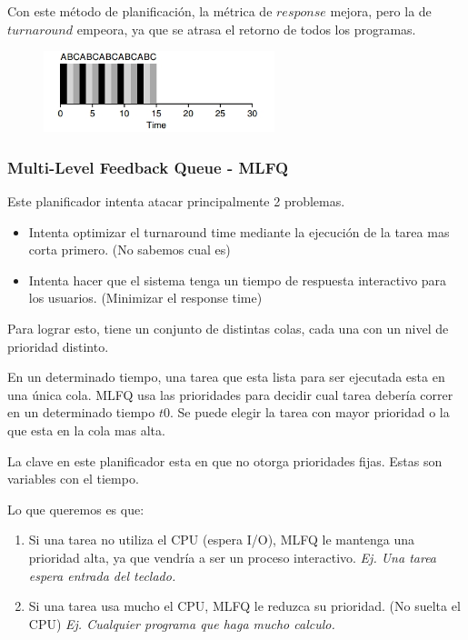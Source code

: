 \documentclass[titlepage,a4paper]{article}
\begin{document}
Con este método de planificación, la métrica de $response$ mejora, pero la de $turnaround$ empeora, ya que se atrasa el retorno de todos los programas.

\begin{figure}[!htb]
    \centering
    \includegraphics[width=0.6\textwidth]{ImagenesApunte/round_robin.jpg}
\end{figure}

\subsubsection*{Multi-Level Feedback Queue - MLFQ}
Este planificador intenta atacar principalmente 2 problemas.
\begin{itemize}
    \item Intenta optimizar el turnaround time mediante la ejecución de la tarea mas corta primero. (No sabemos cual es)
    \item Intenta hacer que el sistema tenga un tiempo de respuesta interactivo para los usuarios. (Minimizar el response time)
\end{itemize}

Para lograr esto, tiene un conjunto de distintas colas, cada una con un nivel de prioridad distinto.

En un determinado tiempo, una tarea que esta lista para ser ejecutada esta en una única cola. MLFQ usa las prioridades para decidir cual tarea debería correr en un determinado tiempo $t0$. Se puede elegir la tarea con mayor prioridad o la que esta en la cola mas alta.

La clave en este planificador esta en que no otorga prioridades fijas. Estas son variables con el tiempo.

Lo que queremos es que:
\begin{enumerate}
    \item Si una tarea no utiliza el CPU (espera I/O), MLFQ le mantenga una prioridad alta, ya que vendría a ser un proceso interactivo. \emph{Ej. Una tarea espera entrada del teclado.}
    \item Si una tarea usa mucho el CPU, MLFQ le reduzca su prioridad. (No suelta el CPU) \textit{Ej. Cualquier programa que haga mucho calculo.}
\end{enumerate}
\end{document}
